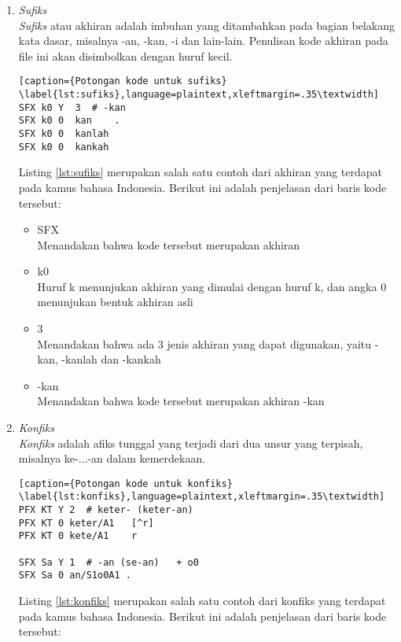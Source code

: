 \begin{enumerate}
	\item \textit{Sufiks} \\	
	\textit{Sufiks} atau akhiran adalah imbuhan yang ditambahkan pada bagian belakang kata dasar, misalnya -an, -kan, -i dan lain-lain. Penulisan kode akhiran pada file ini akan disimbolkan dengan huruf kecil.
	
	\begin{lstlisting}[caption={Potongan kode untuk sufiks}			\label{lst:sufiks},language=plaintext,xleftmargin=.35\textwidth] 
SFX k0 Y  3	 # -kan
SFX k0 0  kan    . 
SFX k0 0  kanlah
SFX k0 0  kankah
	\end{lstlisting}
\medskip
	
	 Listing \ref{lst:sufiks} merupakan salah satu contoh dari akhiran yang terdapat pada kamus bahasa Indonesia. Berikut ini adalah penjelasan dari baris kode tersebut:
	
	\begin{itemize}
		\item SFX\\
		Menandakan bahwa kode tersebut merupakan akhiran
		
		\item k0\\
		Huruf k menunjukan akhiran yang dimulai dengan huruf k, dan angka 0 menunjukan bentuk akhiran asli
		
		\item 3\\
		Menandakan bahwa ada 3 jenis akhiran yang dapat digunakan, yaitu -kan, -kanlah dan -kankah
		
		\item -kan\\
		Menandakan bahwa kode tersebut merupakan akhiran -kan 
	\end{itemize}
	
	\item \textit{Konfiks} \\	
	\textit{Konfiks} adalah afiks tunggal yang terjadi dari dua unsur yang terpisah, misalnya ke-...-an dalam kemerdekaan.
	
	\begin{lstlisting}[caption={Potongan kode untuk konfiks}			\label{lst:konfiks},language=plaintext,xleftmargin=.35\textwidth] 
PFX KT Y 2	# keter- (keter-an)
PFX KT 0 keter/A1	[^r]
PFX KT 0 kete/A1	r

SFX Sa Y 1	# -an (se-an) 	+ o0
SFX Sa 0 an/S1o0A1 . 
	\end{lstlisting}
	
	Listing \ref{lst:konfiks} merupakan salah satu contoh dari konfiks yang terdapat pada kamus bahasa Indonesia. Berikut ini adalah penjelasan dari baris kode tersebut:
	

\end{enumerate}
